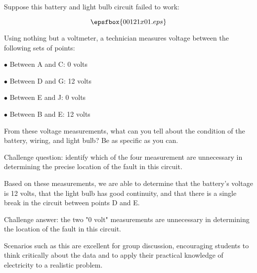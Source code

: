 

Suppose this battery and light bulb circuit failed to work: 

$$\epsfbox{00121x01.eps}$$

Using nothing but a voltmeter, a technician measures voltage between the following sets of points:

\vskip 10pt

\item {$\bullet$} Between A and C: 0 volts
\item {$\bullet$} Between D and G: 12 volts
\item {$\bullet$} Between E and J: 0 volts
\item {$\bullet$} Between B and E: 12 volts

\vskip 10pt

From these voltage measurements, what can you tell about the condition of the battery, wiring, and light bulb?  Be as specific as you can.

\vskip 10pt

Challenge question: identify which of the four measurement are unnecessary in determining the precise location of the fault in this circuit.







Based on these measurements, we are able to determine that the battery's voltage is 12 volts, that the light bulb has good continuity, and that there is a single break in the circuit between points D and E.

\vskip 10pt

Challenge answer: the two "0 volt" measurements are unnecessary in determining the location of the fault in this circuit.







Scenarios such as this are excellent for group discussion, encouraging students to think critically about the data and to apply their practical knowledge of electricity to a realistic problem.




